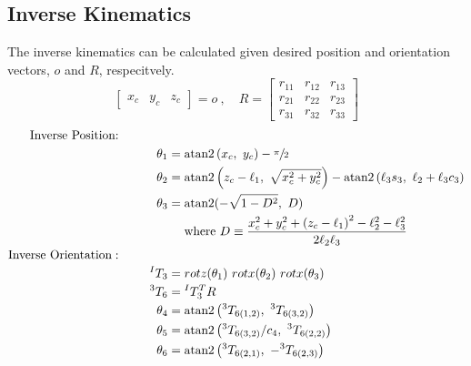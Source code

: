 \subsection{Inverse Kinematics}
The inverse kinematics can be calculated given desired position and orientation vectors, $o$ and $R$, respecitvely.
\[
\begin{bmatrix}x_c & y_c & z_c \end{bmatrix} = o~,\quad
  R =
  \begin{bmatrix}
    r_{11} & r_{12} & r_{13} \\
    r_{21} & r_{22} & r_{23} \\
    r_{31} & r_{32} & r_{33}
  \end{bmatrix}
\]
\begin{equation}
\begin{aligned}
\text{Inverse Position:}\qquad\qquad&\\
\theta_{1}&= \text{atan2} \left(x_{c},~ y_{c}\right) - \sfrac{\pi}{2}\\
\theta_{2}&= \text{atan2} \left(z_c - \ell_1, ~\sqrt{x_c^2 + y_c^2}\right) - \text{atan2}\left(\ell_3s_3,~\ell_2 + \ell_3c_3\right) \\
\theta_{3}&= \text{atan2} (-\sqrt{1-D^{2}},~ D) \\
& \quad \text { where } D\equiv\frac{x_{c}^{2}+y_{c}^{2}+\left(z_{c}-\ell_{1}\right)^{2}-\ell_{2}^{2}-\ell_{3}^{2}}{2 \ell_{2} \ell_{3}} \\
\text{Inverse Orientation}:\qquad\qquad&\\
^IT_3 &= rotz(\theta_1)~rotx(\theta_2)~rotx(\theta_3) \\
{}^3T_6 &= {}^IT_3^TR \\ %
\theta_4 &= \text{atan2} \left({}^3T_{6(1,2)},~{}^3T_{6(3,2)}\right) \\
\theta_5 &= \text{atan2} \left({{}^3T_{6(3,2)}} / {c_4},~{}^3T_{6(2,2)}\right) \\
\theta_6 &= \text{atan2} \left({}^3T_{6(2,1)},~ -{}^3T_{6(2,3)}\right) \\
\end{aligned}
\nonumber
\end{equation}

